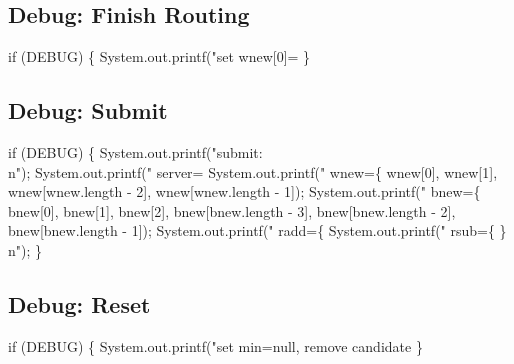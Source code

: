 \subsection{Debug: Finish Routing}

\nwenddocs{}\endmoddef\nwstartdeflinemarkup{}\nwenddeflinemarkup
if (DEBUG) \{
  System.out.printf("set wnew[0]=%
\}
\nwendcode{}\nwdocspar

\subsection{Debug: Submit}

\nwenddocs{}\endmoddef\nwstartdeflinemarkup{}\nwenddeflinemarkup
if (DEBUG) \{
  System.out.printf("submit:\\n");
  System.out.printf("  server=%
  System.out.printf("  wnew=\{ %
      wnew[0], wnew[1], wnew[wnew.length - 2], wnew[wnew.length - 1]);
  System.out.printf("  bnew=\{ %
      bnew[0], bnew[1], bnew[2],
      bnew[bnew.length - 3], bnew[bnew.length - 2], bnew[bnew.length - 1]);
  System.out.printf("  radd=\{ %
  System.out.printf("  rsub=\{ \}\\n");
\}
\nwendcode{}\nwdocspar

\subsection{Debug: Reset}

\nwenddocs{}\endmoddef\nwstartdeflinemarkup{}\nwenddeflinemarkup
if (DEBUG) \{
  System.out.printf("set min=null, remove candidate %
\}
\nwendcode{}\nwdocspar

